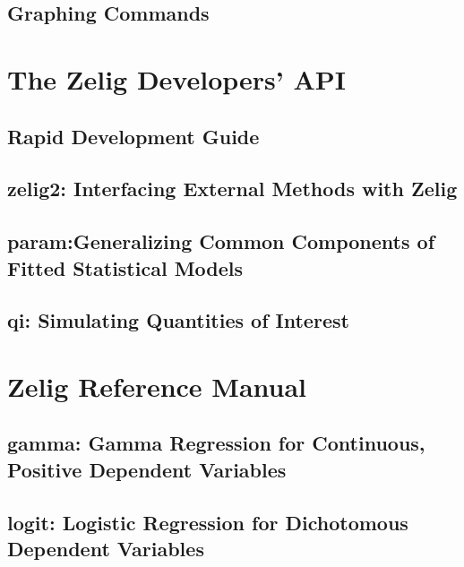 \documentclass{book}
\begin{document}
\chapter[Graphing Commands]{Graphing Commands}
\label{chapter:Graphs}


\part{The Zelig Developers' API}
\label{part:The Zelig API}

\chapter[Development Guide]{Rapid Development Guide}
\label{chapter:Quickstart}


\chapter[zelig2]{zelig2: Interfacing External Methods with Zelig}
\label{chapter:Zelig2}


\chapter[param]{param:Generalizing Common Components of Fitted Statistical Models}
\label{chapter:Parameters}


\chapter[qi]{qi: Simulating Quantities of Interest}
\label{chapter:Qi}


\part{Zelig Reference Manual}
\label{part:Zelig Reference Manual}

\chapter[gamma]{gamma: Gamma Regression for Continuous, Positive Dependent Variables}
\label{chapter:Gamma}


\chapter[logit]{logit: Logistic Regression for Dichotomous Dependent Variables}
\label{chapter:Logit}

\end{document}
